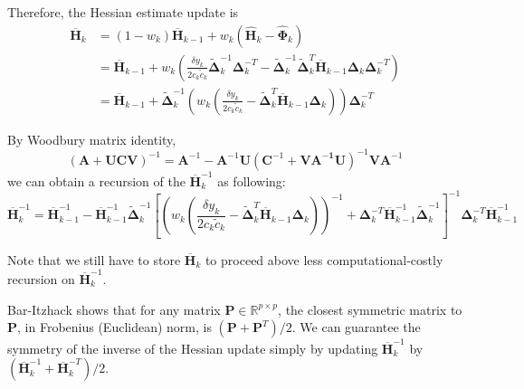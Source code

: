 \documentclass[conference]{IEEEtran}
\newcommand{\bDelta}{\bm{\Delta}}
\newcommand{\oH}{\bm{\overline{H}}}
\newcommand{\hH}{\bm{\hat{H}}}
\newcommand{\hPhi}{\bm{\hat{\Phi}}}
\newcommand{\tDelta}{\bm{\tilde{\Delta}}}
\begin{document}
Therefore, the Hessian estimate update is
\begin{align*}
\oH_k&=(1-w_k)\oH_{k-1}+w_k(\hH_k-\hPhi_k)\\
&=\oH_{k-1}+w_k(\frac{\delta y_k}{2c_k\tilde{c}_k}\tDelta_k^{-1}\bDelta_k^{-T}-\tDelta_k^{-1}\tDelta_k^{T}\oH_{k-1}\bDelta_k\bDelta_k^{-T})\\
&=\oH_{k-1}+\tDelta_k^{-1}\left(w_k(\frac{\delta y_k}{2c_k\tilde{c}_k}-\tDelta_k^{T}\oH_{k-1}\bDelta_k)\right)\bDelta_k^{-T}
\end{align*}

By Woodbury matrix identity,
\begin{equation*}
(\bm{A}+\bm{UCV})^{-1}=\bm{A}^{-1}-\bm{A}^{-1}\bm{U}(\bm{C}^{-1}+\bm{VA^{-1}U})^{-1}\bm{V}\bm{A}^{-1}
\end{equation*}
we can obtain a recursion of the $ \oH_k^{-1} $ as following:
\begin{equation*}
\oH_k^{-1}=\oH_{k-1}^{-1}-\oH_{k-1}^{-1}\tDelta_k^{-1}\left[ \left(w_k(\frac{\delta y_k}{2c_k\tilde{c}_k}-\tDelta_k^{T}\oH_{k-1}\bDelta_k)\right)^{-1} + \bDelta_k^{-T}\oH_{k-1}^{-1}\tDelta_k^{-1} \right]^{-1}\bDelta_k^{-T}\oH_{k-1}^{-1}
\end{equation*}

Note that we still have to store $ \oH_{k} $ to proceed above less computational-costly recursion on $ \oH_k^{-1} $.

Bar-Itzhack \cite{Bar-Itzhack1998} shows that for any matrix $ \bm{P}\in\mathbb{R}^{p\times p} $, the closest symmetric matrix to $ \bm{P} $, in Frobenius (Euclidean) norm, is $ (\bm{P}+\bm{P}^T)/2 $. We can guarantee the symmetry of the inverse of the Hessian update simply by updating $ \oH_k^{-1} $ by $ (\oH_k^{-1}+\oH_k^{-T})/2 $.

%
%
\end{document}

